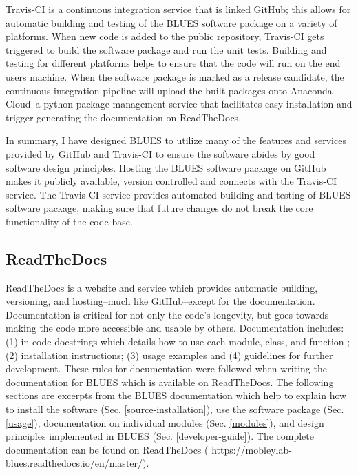 Travis-CI is a continuous integration service that is linked GitHub; this allows for automatic building and testing of the BLUES software package on a variety of platforms.
When new code is added to the public repository, Travis-CI gets triggered to build the software package and run the unit tests.
Building and testing for different platforms helps to ensure that the code will run on the end users machine.
When the software package is marked as a release candidate, the continuous integration pipeline will upload the built packages onto Anaconda Cloud--a python package management service that facilitates easy installation and trigger generating the documentation on ReadTheDocs.

In summary, I have designed BLUES to utilize many of the features and services provided by GitHub and Travis-CI to ensure the software abides by good software design principles.
Hosting the BLUES software package on GitHub makes it publicly available, version controlled and connects with the Travis-CI service.
The Travis-CI service provides automated building and testing of BLUES software package, making sure that future changes do not break the core functionality of the code base. 

\subsection{ReadTheDocs}
ReadTheDocs is a website and service which provides automatic building, versioning, and hosting--much like GitHub--except for the documentation.
Documentation is critical for not only the code's longevity, but goes towards making the code more accessible and usable by others.
Documentation includes: (1) in-code docstrings which details how to use each module, class, and function ; (2) installation instructions; (3) usage examples and (4) guidelines for further development.
These rules for documentation were followed when writing the documentation for BLUES which is available on ReadTheDocs. 
The following sections are excerpts from the BLUES documentation which help to explain how to install the software (Sec. \ref{source-installation}), use the software package (Sec. \ref{usage}), documentation on individual modules (Sec. \ref{modules}), and design principles implemented in BLUES (Sec. \ref{developer-guide}).
The complete documentation can be found on ReadTheDocs ( https://mobleylab-blues.readthedocs.io/en/master/).


